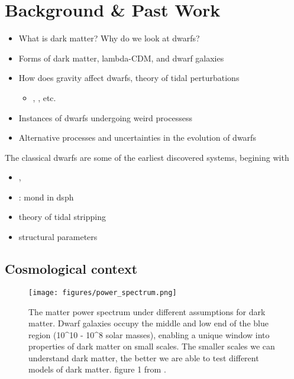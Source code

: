 \section{Background \& Past Work}\label{background-past-work}

\begin{itemize}
\tightlist
\item
  What is dark matter? Why do we look at dwarfs?
\item
  Forms of dark matter, lambda-CDM, and dwarf galaxies
\item
  How does gravity affect dwarfs, theory of tidal perturbations

  \begin{itemize}
  \tightlist
  \item
    \citet{EN2021}, \citet{PNM2008}, etc.
  \end{itemize}
\item
  Instances of dwarfs undergoing weird processess
\item
  Alternative processes and uncertainties in the evolution of dwarfs
\end{itemize}

The classical dwarfs are some of the earliest discovered systems,
begining with \citet{shapley1938}

\begin{itemize}
\tightlist
\item
  \citet{fattahi+2013}, \citet{fattahi+2018}
\item
  \citet{sanchez-salcedo+hernandez2007}: mond in dsph
\item
  \citet{mayer+2001} theory of tidal stripping
\item
  \citet{IH1995} structural parameters
\end{itemize}

\subsection{Cosmological context}\label{cosmological-context}

\begin{figure}
\centering
\texttt{[image: figures/power\_spectrum.png]}
\caption[Cosmological Power Spectrum]{The matter power spectrum under
different assumptions for dark matter. Dwarf galaxies occupy the middle
and low end of the blue region (10\^{}10 - 10\^{}8 solar masses),
enabling a unique window into properties of dark matter on small scales.
The smaller scales we can understand dark matter, the better we are able
to test different models of dark matter. figure 1 from
\citet{bechtol+2022}.}\label{fig:cosmological_power_spectrum}
\end{figure}

